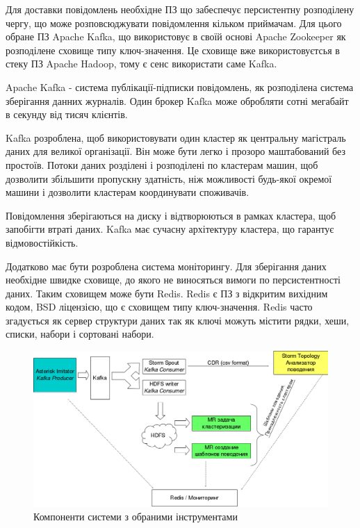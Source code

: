 Для доставки повідомлень необхідне ПЗ що забеспечує персистентну розподілену чергу, що може розповсюджувати повідомлення кільком приймачам. Для цього обране ПЗ Apache Kafka, що використовує в своїй основі Apache Zookeeper як розподілене сховище типу ключ-значення. Це сховище вже використовуєтсья в стеку ПЗ Apache Hadoop, тому є сенс використати саме Kafka.

Apache Kafka - система публікації-підписки повідомлень, як розподілена система зберігання данних журналів. Один брокер Kafka може обробляти сотні мегабайт в секунду від тисяч клієнтів.

Kafka розроблена, щоб використовувати один кластер як центральну магістраль даних для великої організації. Він може бути легко і прозоро маштабований без простоїв. Потоки даних розділені і розподілені по кластерам машин, щоб дозволити збільшити пропускну здатність, ніж можливості будь-якої окремої машини і дозволити кластерам координувати споживачів.

Повідомлення зберігаються на диску і відтворюються в рамках кластера, щоб запобігти втраті даних. Kafka має сучасну архітектуру кластера, що гарантує відмовостійкість.

Додатково має бути розроблена система моніторингу. Для зберігання даних необхідне швидке сховище, до якого не виносяться вимоги по персистентності даних. Таким сховищем може бути Redis.  Redis є ПЗ з відкритим вихідним кодом, BSD ліцензією, що є сховищем типу ключ-значення. Redis часто згадується як сервер структури даних так як ключі можуть містити рядки, хеши, списки, набори і сортовані набори.
\begin{figure}[h]
        \begin{center}
            \includegraphics[scale=0.6]{resources/struct-3.png}
        \end{center}
        \caption{Компоненти системи з обраними інструментами}
        \label{fig:struct-scheme-components}
\end{figure}

